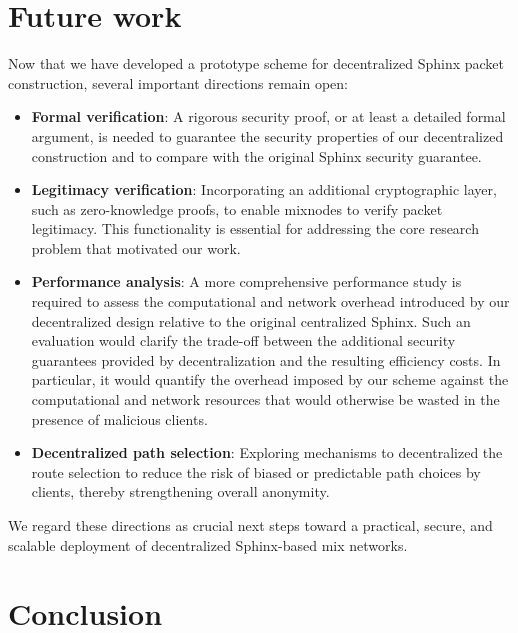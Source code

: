 \section{Future work}\label{sec:future_work}

Now that we have developed a prototype scheme for decentralized Sphinx packet construction, several important directions remain open:
\begin{itemize}
    \item \textbf{Formal verification}: 
    A rigorous security proof, or at least a detailed formal argument, is needed to guarantee the security properties of our decentralized construction and to compare with the original Sphinx security guarantee.

    \item \textbf{Legitimacy verification}: 
    Incorporating an additional cryptographic layer, such as zero-knowledge proofs, to enable mixnodes to verify packet legitimacy. 
    This functionality is essential for addressing the core research problem that motivated our work.

    \item \textbf{Performance analysis}: 
    A more comprehensive performance study is required to assess the computational and network overhead introduced by our decentralized design relative to the original centralized Sphinx.
    Such an evaluation would clarify the trade-off between the additional security guarantees provided by decentralization and the resulting efficiency costs.
    In particular, it would quantify the overhead imposed by our scheme against the computational and network resources that would otherwise be wasted in the presence of malicious clients.

    \item \textbf{Decentralized path selection}: 
    Exploring mechanisms to decentralized the route selection to reduce the risk of biased or predictable path choices by clients, thereby strengthening overall anonymity.

\end{itemize}
We regard these directions as crucial next steps toward a practical, secure, and scalable deployment of decentralized Sphinx-based mix networks.


\section{Conclusion}\label{sec:conclusion}


